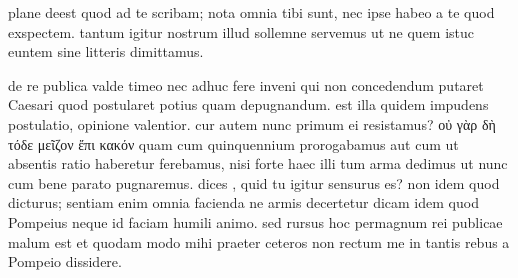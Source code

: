


 plane deest quod ad te scribam; nota omnia tibi sunt, nec ipse habeo a te quod exspectem. tantum igitur nostrum illud sollemne servemus ut ne quem istuc euntem sine litteris dimittamus.

 de re publica valde timeo nec adhuc fere inveni qui non concedendum putaret Caesari quod postularet potius quam depugnandum. est illa quidem impudens postulatio, opinione valentior. cur autem nunc primum ei resistamus? οὐ γὰρ δὴ τόδε μεῖζον ἔπι κακόν quam cum quinquennium prorogabamus aut cum ut absentis ratio haberetur ferebamus, nisi forte haec illi tum arma dedimus ut nunc cum bene parato pugnaremus. dices , quid tu igitur sensurus es? non idem quod dicturus; sentiam enim omnia facienda ne armis decertetur dicam idem quod Pompeius neque id faciam humili animo. sed rursus hoc permagnum rei publicae malum est et quodam modo mihi praeter ceteros non rectum me in tantis rebus a Pompeio dissidere.
